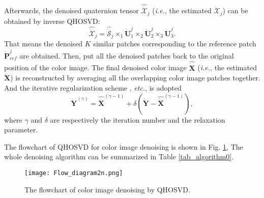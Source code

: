 \documentclass[journal]{IEEEtran}
\begin{document}
Afterwards, the denoised quaternion tensor $\hat{\dot{\mathcal{X}}}_{j}$ (\emph{i.e.}, the estimated $\dot{\mathcal{X}}_{j}$) can be obtained by inverse QHOSVD:
\begin{equation}\label{noise_eq6}
\hat{\dot{\mathcal{X}}}_{j}=\hat{\dot{\mathcal{S}}}_{j}\times_{1}\dot{\mathbf{U}}_{1}^{j}\times_{2}\dot{\mathbf{U}}_{2}^{j}\times_{3}\dot{\mathbf{U}}_{3}^{j}.
\end{equation}
That means the denoised $K$ similar patches corresponding to the reference patch $\dot{\mathbf{P}}_{ref}^{j}$ are obtained. Then, put all the denoised patches back to the original position of the color image. The final denoised color image $\hat{\dot{\mathbf{X}}}$ (\emph{i.e.}, the estimated $\dot{\mathbf{X}}$) is reconstructed by averaging all the overlapping color image patches together. And the iterative regularization scheme \cite{DBLP:journals/ijcv/GuXMZFZ17,DBLP:journals/ijon/YuZY19,DBLP:journals/tip/ChenXZ20}, \emph{etc.}, is adopted
\begin{equation*}
\dot{\mathbf{Y}}^{(\gamma)}=\hat{\dot{\mathbf{X}}}^{(\gamma-1)}+\delta(\dot{\mathbf{Y}}-\hat{\dot{\mathbf{X}}}^{(\gamma-1)}),
\end{equation*}
where $\gamma$ and $\delta$ are respectively the iteration number and the relaxation parameter.

The  flowchart  of  QHOSVD  for  color image denoising is shown in Fig. \ref{Flow_diagram2},  The whole denoising algorithm can be summarized in Table \ref{tab_algorithm0}.
\begin{figure}[htbp]
	\centering
	\texttt{[image: Flow\_diagram2n.png]}
	\caption{The flowchart of color image denoising by QHOSVD.}
	\label{Flow_diagram2}
\end{figure}
\end{document}
